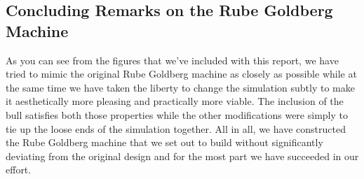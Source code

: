 \documentclass[11pt] {article}
\begin{document}
\subsection {Concluding Remarks on the Rube Goldberg Machine}

As you can see from the figures that we've included with this report, we have tried to mimic the original Rube
Goldberg machine as closely as possible while at the same time we have taken the liberty to change the
simulation subtly to make it aesthetically more pleasing and practically more viable. The inclusion of the
bull satisfies both those properties while the other modifications were simply to tie up the loose ends of 
the simulation together. All in all, we have constructed the Rube Goldberg machine that we set out to build
without significantly deviating from the original design and for the most part we have succeeded in our effort.
 

\end{document}
